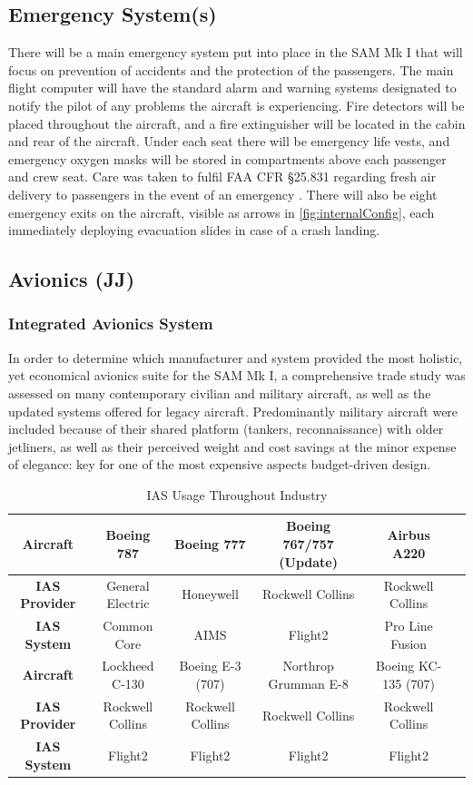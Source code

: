 \subsection{Emergency System(s)}
There will be a main emergency system put into place in the SAM Mk I that will focus on prevention of accidents and the protection of the passengers. The main flight computer will have the standard alarm and warning systems designated to notify the pilot of any problems the aircraft is experiencing. Fire detectors will be placed throughout the aircraft, and a fire extinguisher will be located in the cabin and rear of the aircraft. Under each seat there will be emergency life vests, and emergency oxygen masks will be stored in compartments above each passenger and crew seat. Care was taken to fulfil FAA CFR \S 25.831 regarding fresh air delivery to passengers in the event of an emergency \cite{cfr}.  There will also be eight emergency exits on the aircraft, visible as arrows in \ref{fig:internalConfig}, each immediately deploying evacuation slides in case of a crash landing. 

\subsection{Avionics (JJ)}
\subsubsection{Integrated Avionics System}
In order to determine which manufacturer and system provided the most holistic, yet economical avionics suite for the SAM Mk I, a comprehensive trade study was assessed on many contemporary civilian and military aircraft, as well as the updated systems offered for legacy aircraft.  Predominantly military aircraft were included because of their shared platform (tankers, reconnaissance) with older jetliners, as well as their perceived weight and cost savings at the minor expense of elegance: key for one of the most expensive aspects budget-driven design. 

\begin{table}[!h] 
    \centering
    \caption{IAS Usage Throughout Industry}
    \begin{tabular}{ |c||c|c|c|c|c|}\toprule
    \textbf{Aircraft}  & Boeing 787 & Boeing 777 & Boeing 767/757 (Update) & Airbus A220 \\\hline 
    \textbf{IAS Provider} & General Electric & Honeywell & Rockwell Collins & Rockwell Collins  \\\hline
    \textbf{IAS System} & Common Core & AIMS & Flight2 & Pro Line Fusion \\\hline \hline \hline
    \textbf{Aircraft}  & Lockheed C-130 & Boeing E-3 (707) & Northrop Grumman E-8 & Boeing KC-135 (707) \\\hline
    \textbf{IAS Provider} & Rockwell Collins & Rockwell Collins & Rockwell Collins & Rockwell Collins  \\\hline
    \textbf{IAS System} & Flight2 & Flight2 & Flight2 & Flight2
    \\ \bottomrule
    \end{tabular}\label{tab:ias}
\end{table}

